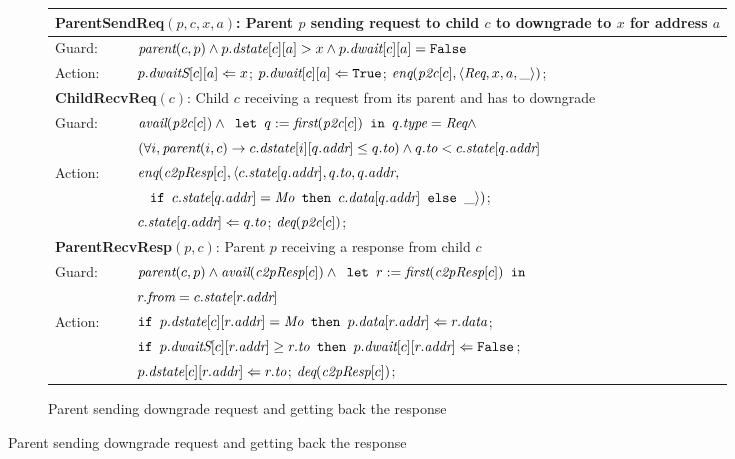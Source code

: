 \begin{figure}
\begin{subfigure}{\textwidth}
\centering
\begin{tabular}{|ll|}
\hline
\multicolumn{2}{|l|}{\textbf{ParentSendReq}$(p, c, x, a)$: Parent $p$ sending request to child $c$ to downgrade to $x$ for address $a$}\\
\hline
Guard: & $\textit{parent}(c,p) \wedge p.\textit{dstate}[c][a] > x \wedge p.\textit{dwait}[c][a] = \texttt{False}$\\
\hline
Action: & $p.\textit{dwaitS}[c][a] \Leftarrow x$; $p.\textit{dwait}[c][a] \Leftarrow \texttt{True}$; $\textit{enq}(\textit{p2c}[c], \langle \textit{Req}, x, a, \_ \rangle)$;\\
\hline
\hline
\multicolumn{2}{|p{\textwidth}|}{\textbf{ChildRecvReq}$(c)$: Child $c$ receiving a request from its parent and has to downgrade}\\
\hline
Guard: & 
$\textit{avail}(\textit{p2c}[c]) \wedge \texttt{ let } q := \textit{first}(\textit{p2c}[c]) \texttt{ in } q.\textit{type} = \textit{Req} \wedge$ \\
& $(\forall i, \textit{parent}(i, c) \rightarrow c.\textit{dstate}[i][q.\textit{addr}] \le q.\textit{to}) \wedge q.\textit{to} < c.\textit{state}[q.\textit{addr}]$\\
\hline
Action: & $\textit{enq}(\textit{c2pResp}[c], \langle c.\textit{state}[q.\textit{addr}], q.\textit{to}, q.\textit{addr},$\\
& $\;\;\;%
\myif c.\state[q.\addr] = \Mo \mythen c.\data[q.\addr] \myelse \_\rangle)$;\\
& $c.\textit{state}[q.\textit{addr}] \Leftarrow q.\textit{to}$; $\textit{deq}(\textit{p2c}[c])$;\\
\hline
\hline
\multicolumn{2}{|l|}{\textbf{ParentRecvResp}$(p, c)$: Parent $p$ receiving a response from child $c$}\\
\hline
Guard: & 
$\textit{parent}(c,p) \wedge \textit{avail}(\textit{c2pResp}[c]) \wedge \texttt{ let } r := \textit{first}(\textit{c2pResp}[c]) \texttt{ in }$\\
& $r.\textit{from} = c.\textit{state}[r.\textit{addr}]$\\
\hline
Action: & $\texttt{if } p.\textit{dstate}[c][r.\textit{addr}] = \textit{Mo} \texttt{ then } p.\textit{data}[r.\textit{addr}] \Leftarrow r.\textit{data}$;\\
&$\texttt{if } p.\textit{dwaitS}[c][r.\textit{addr}] \ge r.\textit{to} \texttt{ then } p.\textit{dwait}[c][r.\textit{addr}] \Leftarrow \texttt{False} $;\\
& $p.\textit{dstate}[c][r.\textit{addr}] \Leftarrow r.\textit{to}$; $\textit{deq}(\textit{c2pResp}[c])$;\\
\hline
\end{tabular}
\caption{Parent sending downgrade request and getting back the response}
\end{subfigure}


\end{figure}
